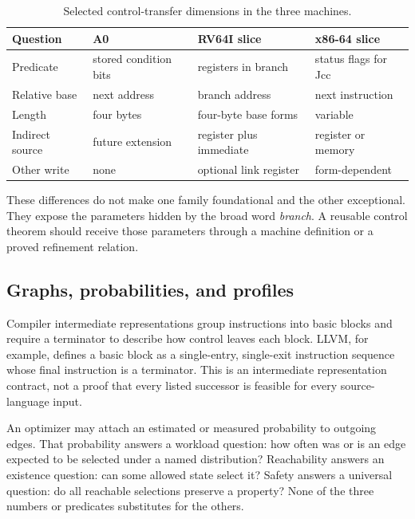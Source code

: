 \begin{table}
\centering
\caption{Selected control-transfer dimensions in the three machines.}
\begin{tabular}{p{}p{}p{}p{}}
\toprule
Question & A0 & RV64I slice & x86-64 slice \\
\midrule
Predicate & stored condition bits & registers in branch & status flags for Jcc \\
Relative base & next address & branch address & next instruction \\
Length & four bytes & four-byte base forms & variable \\
Indirect source & future extension & register plus immediate & register or memory \\
Other write & none & optional link register & form-dependent \\
\bottomrule
\end{tabular}
\end{table}

These differences do not make one family foundational and the other
exceptional. They expose the parameters hidden by the broad word
\emph{branch}. A reusable control theorem should receive those parameters
through a machine definition or a proved refinement relation.

\subsection{Graphs, probabilities, and profiles}

Compiler intermediate representations group instructions into basic blocks
and require a terminator to describe how control leaves each block. LLVM, for
example, defines a basic block as a single-entry, single-exit instruction
sequence whose final instruction is a terminator. This is an intermediate
representation contract, not a proof that every listed successor is feasible
for every source-language input.\autocite{llvm2026programmer}

An optimizer may attach an estimated or measured probability to outgoing
edges. That probability answers a workload question: how often was or is an
edge expected to be selected under a named distribution? Reachability answers
an existence question: can some allowed state select it? Safety answers a
universal question: do all reachable selections preserve a property? None of
the three numbers or predicates substitutes for the others.

